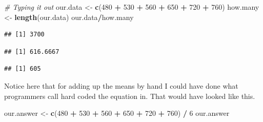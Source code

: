 \documentclass[]{book}
\newenvironment{Shaded}{\begin{snugshade}}{\end{snugshade}}
\newcommand{\KeywordTok}[1]{\textcolor[rgb]{0.13,0.29,0.53}{\textbf{#1}}}
\newcommand{\DecValTok}[1]{\textcolor[rgb]{0.00,0.00,0.81}{#1}}
\newcommand{\StringTok}[1]{\textcolor[rgb]{0.31,0.60,0.02}{#1}}
\newcommand{\CommentTok}[1]{\textcolor[rgb]{0.56,0.35,0.01}{\textit{#1}}}
\newcommand{\OperatorTok}[1]{\textcolor[rgb]{0.81,0.36,0.00}{\textbf{#1}}}
\newcommand{\NormalTok}[1]{#1}
\theoremstyle{definition}
\theoremstyle{definition}
\theoremstyle{definition}
\theoremstyle{remark}
\begin{document}
\begin{Shaded}
\begin{Highlighting}[]
\CommentTok{# Typing it out }
\NormalTok{our.data <-}\StringTok{ }\KeywordTok{c}\NormalTok{(}\DecValTok{480} \OperatorTok{+}\StringTok{ }\DecValTok{530} \OperatorTok{+}\StringTok{ }\DecValTok{560} \OperatorTok{+}\StringTok{ }\DecValTok{650} \OperatorTok{+}\StringTok{ }\DecValTok{720} \OperatorTok{+}\StringTok{ }\DecValTok{760}\NormalTok{)}
\NormalTok{how.many <-}\StringTok{ }\KeywordTok{length}\NormalTok{(our.data)}
\NormalTok{our.data}\OperatorTok{/}\NormalTok{how.many}
\end{Highlighting}
\end{Shaded}

\begin{verbatim}
## [1] 3700
\end{verbatim}

\begin{Shaded}
\end{Shaded}

\begin{verbatim}
## [1] 616.6667
\end{verbatim}

\begin{Shaded}
\end{Shaded}

\begin{verbatim}
## [1] 605
\end{verbatim}

Notice here that for adding up the means by hand I could have done what
programmers call hard coded the equation in. That would have looked like
this.

\begin{Shaded}
\begin{Highlighting}[]
\NormalTok{our.answer <-}\StringTok{ }\KeywordTok{c}\NormalTok{(}\DecValTok{480} \OperatorTok{+}\StringTok{ }\DecValTok{530} \OperatorTok{+}\StringTok{ }\DecValTok{560} \OperatorTok{+}\StringTok{ }\DecValTok{650} \OperatorTok{+}\StringTok{ }\DecValTok{720} \OperatorTok{+}\StringTok{ }\DecValTok{760}\NormalTok{) }\OperatorTok{/}\StringTok{ }\DecValTok{6}
\NormalTok{our.answer}
\end{Highlighting}
\end{Shaded}
\end{document}

